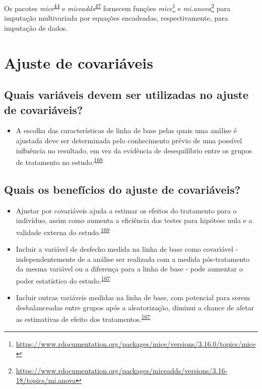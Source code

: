 \documentclass[
  a4paper,
]{book}
\providecommand{\tightlist}{%
  \setlength{\itemsep}{0pt}\setlength{\parskip}{0pt}}
\renewcommand{\href}[2]{#2\footnote{\url{#1}}}
\newenvironment{infobox}[1]
  {
  \begin{itemize}
  \renewcommand{\labelitemi}{
    \raisebox{-.7\height}[0pt][0pt]{
      {\setkeys{Gin}{width=3em,keepaspectratio}
        \texttt{[image: \#1]}}
    }
  }
  \setlength{\fboxsep}{1em}
  \begin{blackbox}
  \item
  }
  {
  \end{blackbox}
  \end{itemize}
  }
\begin{document}
\begin{infobox}{images/Rlogo}
Os pacotes \emph{mice}\textsuperscript{\protect\hyperlink{ref-mice}{44}} e \emph{miceadds}\textsuperscript{\protect\hyperlink{ref-miceadds}{47}} fornecem funções \href{https://www.rdocumentation.org/packages/mice/versions/3.16.0/topics/mice}{\emph{mice}} e \href{https://www.rdocumentation.org/packages/miceadds/versions/3.16-18/topics/mi.anova}{\emph{mi.anova}} para imputação multivariada por equações encadeadas, respectivamente, para imputação de dados.

\end{infobox}

\hypertarget{ajuste-de-covariaveis}{%
\section{Ajuste de covariáveis}\label{ajuste-de-covariaveis}}

\hypertarget{quais-variuxe1veis-devem-ser-utilizadas-no-ajuste-de-covariuxe1veis}{%
\subsection{Quais variáveis devem ser utilizadas no ajuste de covariáveis?}\label{quais-variuxe1veis-devem-ser-utilizadas-no-ajuste-de-covariuxe1veis}}

\begin{itemize}
\tightlist
\item
  A escolha das características de linha de base pelas quais uma análise é ajustada deve ser determinada pelo conhecimento prévio de uma possível influência no resultado, em vez da evidência de desequilíbrio entre os grupos de tratamento no estudo.\textsuperscript{\protect\hyperlink{ref-roberts1999}{168}}
\end{itemize}

\hypertarget{quais-os-benefuxedcios-do-ajuste-de-covariuxe1veis}{%
\subsection{Quais os benefícios do ajuste de covariáveis?}\label{quais-os-benefuxedcios-do-ajuste-de-covariuxe1veis}}

\begin{itemize}
\item
  Ajustar por covariáveis ajuda a estimar os efeitos do tratamento para o indivíduo, assim como aumenta a eficiência dos testes para hipótese nula e a validade externa do estudo.\textsuperscript{\protect\hyperlink{ref-Hauck1998}{169}}
\item
  Incluir a variável de desfecho medida na linha de base como covariável - independentemente de a análise ser realizada com a medida pós-tratamento da mesma variável ou a diferença para a linha de base - pode aumentar o poder estatístico do estudo.\textsuperscript{\protect\hyperlink{ref-Kahan2014}{167}}
\item
  Incluir outras variáveis medidas na linha de base, com potencial para serem desbalanceadas entre grupos após a aleatorização, diminui a chance de afetar as estimativas de efeito dos tratamentos.\textsuperscript{\protect\hyperlink{ref-Kahan2014}{167}}
\end{itemize}
\end{document}
